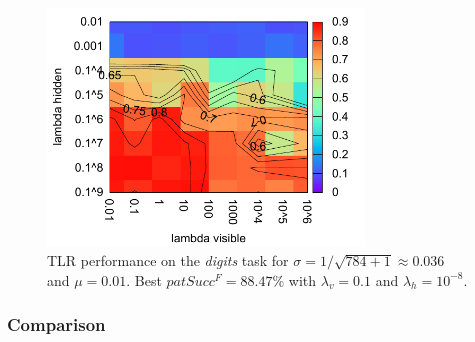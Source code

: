 
\begin{figure}[H]
  \centering
  \includegraphics[width=0.75\textwidth]{img/tlr-digits-psf.pdf} %
  \caption{TLR performance on the \emph{digits} task for $\sigma = 1/\sqrt{784+1} \approx 0.036$ and $\mu = 0.01$. Best $patSucc^F = 88.47\%$ with $\lambda_v=0.1$ and $\lambda_h=10^{-8}$.}
  \label{fig:results-tlr-digits-success}
\end{figure}



\subsubsection{Comparison} 
\label{sec:results-cmp-digits} 

